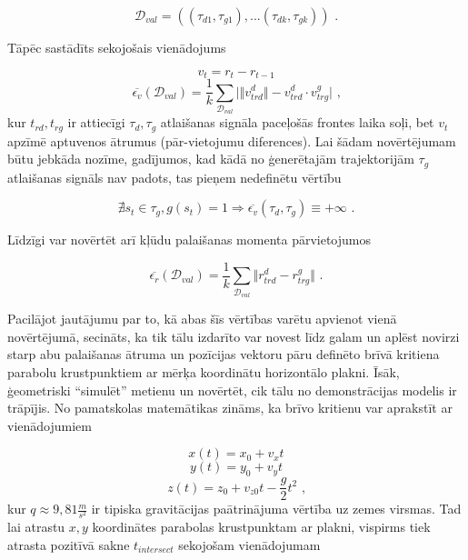 \documentclass[12pt, a4paper]{article}
\numberwithin{equation}{section} %
\begin{document}
\begin{equation}
    \mathcal{D}_{val} = \left (  (\tau_{d1}, \tau_{g1}), ...
     (\tau_{dk}, \tau_{gk}) \right )
\text{ .}
\end{equation}

Tāpēc sastādīts sekojošais vienādojums

\begin{equation}
    v_t = r_t - r_{t-1}
\end{equation}
\begin{equation}
    \overline{\epsilon_v}(\mathcal{D}_{val}) = \frac{1}{k} \sum_{\mathcal{D}_{val}}
    \vert \Vert v^d_{trd} \Vert - v^d_{trd} \cdot v^g_{trg} \vert 
\text{ ,}
\end{equation}
kur $t_{rd}, t_{rg}$ ir attiecīgi $\tau_{d}, \tau_{g}$ atlaišanas signāla paceļošās frontes laika soļi, bet $v_t$ apzīmē aptuvenos ātrumus (pār-vietojumu diferences). Lai šādam novērtējumam būtu jebkāda nozīme, gadījumos, kad kādā no ģenerētajām trajektorijām $\tau_{g}$ atlaišanas signāls nav padots, tas pieņem nedefinētu vērtību

\begin{equation}
    \nexists s_t \in \tau_{g}, g(s_t) = 1 
    \Rightarrow
    \overline{\epsilon_v}(\tau_{d},\tau_{g}) \equiv +\infty 
\text{ .}
\end{equation}

Līdzīgi var novērtēt arī kļūdu palaišanas momenta pārvietojumos

\begin{equation}
    \overline{\epsilon_r}(\mathcal{D}_{val}) = \frac{1}{k} \sum_{\mathcal{D}_{val}}
    \Vert r^d_{trd} - r^g_{trg} \Vert 
\text{ .}
\end{equation}

Pacilājot jautājumu par to, kā abas šīs vērtības varētu apvienot vienā novērtējumā, secināts, ka tik tālu izdarīto var novest līdz galam un aplēst novirzi starp abu palaišanas ātruma un pozīcijas vektoru pāru definēto brīvā kritiena parabolu krustpunktiem ar mērķa koordinātu horizontālo plakni. Īsāk, ģeometriski ``simulēt'' metienu un novērtēt, cik tālu no demonstrācijas modelis ir trāpījis. No pamatskolas matemātikas zināms, ka brīvo kritienu var aprakstīt ar vienādojumiem

\begin{equation}
    x(t) = x_0 + v_xt 
\end{equation}
\begin{equation}
    y(t) = y_0 + v_yt 
\end{equation}
\begin{equation}
    z(t) = z_0 + v_{z0}t - \frac{g}{2}t^2 
\text{ ,}
\end{equation}
kur $q \approx 9,81 \frac{m}{s^2}$ ir tipiska gravitācijas paātrinājuma vērtība uz zemes virsmas. Tad lai atrastu $x,y$ koordinātes parabolas krustpunktam ar plakni, vispirms tiek atrasta pozitīvā sakne $t_{intersect}$ sekojošam vienādojumam
\end{document}
